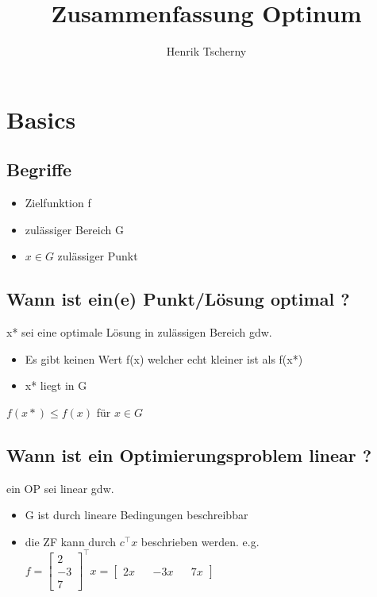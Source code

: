 \documentclass[12pt,a4paper, hyperref]{article}
\title{Zusammenfassung Optinum}
\author{Henrik Tscherny}
\begin{document}
\maketitle
\tableofcontents

\section{Basics}

\subsection{Begriffe}
\begin{itemize}
\item Zielfunktion f
\item zulässiger Bereich G
\item $x \in G$ zulässiger Punkt
\end{itemize}

\subsection{Wann ist ein(e) Punkt/Lösung optimal ?}

x* sei eine optimale Lösung in zulässigen Bereich gdw. 
\begin{itemize}
\item Es gibt keinen Wert f(x) welcher echt kleiner ist als f(x*)
\item x* liegt in G
\end{itemize}


 $f(x*) \leq f(x)$ für $x \in G$

\subsection{Wann ist ein Optimierungsproblem linear ?}
ein OP sei linear gdw.
\begin{itemize}
\item G ist durch lineare Bedingungen beschreibbar
\item die ZF kann durch $c^\intercal x$ beschrieben werden. e.g.
$f=\begin{bmatrix} 2 \\ -3 \\ 7\end{bmatrix}^\intercal x = \begin{bmatrix}
2x && -3x && 7x\end{bmatrix}$
\end{itemize}
\end{document}
